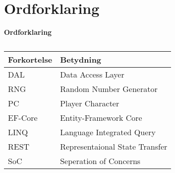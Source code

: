 \section{Ordforklaring}

\textbf{Ordforklaring}\\
\begin{table}[H]
  \caption{}
  \label{tab:}
  \begin{tabular}{|p{5cm}|p{5cm}|}
    \hline
    Forkortelse & Betydning\\
    \hline
    DAL & Data Access Layer\\
    \hline
    RNG & Random Number Generator\\
    \hline
    PC & Player Character\\
    \hline
    EF-Core & Entity-Framework Core\\
    \hline
    LINQ & Language Integrated Query\\
    \hline
    REST & Representaional State Transfer\\
    \hline
    SoC & Seperation of Concerns\\
    \hline
  \end{tabular}
\end{table}
